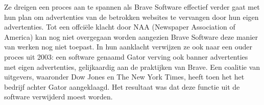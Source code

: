 \documentclass[pdftex,a4paper,12pt,twoside]{report}
\begin{document}
Ze dreigen een proces aan te spannen als Brave Software effectief verder gaat met hun plan om advertenties van de betrokken websites te vervangen door hun eigen advertenties. Tot een offciële klacht door NAA (Newspaper Association of America) kan nog niet overgegaan worden aangezien Brave Software deze manier van werken nog niet toepast. In hun aanklacht verwijzen ze ook naar een ouder proces uit 2003: een software genaamd Gator verving ook banner advertenties met eigen advertenties, gelijkaardig aan de praktijken van Brave. Een coalitie van uitgevers, waaronder Dow Jones en The New York Times, heeft toen het het bedrijf achter Gator aangeklaagd. Het resultaat was dat deze functie uit de software verwijderd moest worden.

\end{document}
